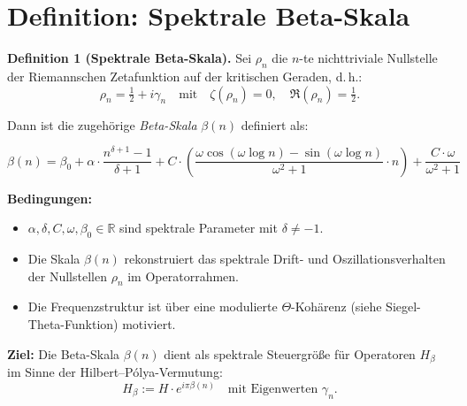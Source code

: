 \documentclass{article}
\begin{document}
\section*{Definition: Spektrale Beta-Skala}

\textbf{Definition 1 (Spektrale Beta-Skala).}  
Sei $\rho_n$ die $n$-te nichttriviale Nullstelle der Riemannschen Zetafunktion auf der kritischen Geraden, d.\,h.:
\[
\rho_n = \tfrac{1}{2} + i\gamma_n \quad \text{mit} \quad \zeta(\rho_n) = 0, \quad \Re(\rho_n) = \tfrac{1}{2}.
\]

Dann ist die zugehörige \emph{Beta-Skala} $\beta(n)$ definiert als:

\[
\boxed{
\beta(n) = \beta_0 + \alpha \cdot \frac{n^{\delta + 1} - 1}{\delta + 1} + C \cdot \left( \frac{\omega \cos(\omega \log n) - \sin(\omega \log n)}{\omega^2 + 1} \cdot n \right) + \frac{C \cdot \omega}{\omega^2 + 1}
}
\]

\textbf{Bedingungen:}
\begin{itemize}
  \item $\alpha, \delta, C, \omega, \beta_0 \in \mathbb{R}$ sind spektrale Parameter mit $\delta \ne -1$.
  \item Die Skala $\beta(n)$ rekonstruiert das spektrale Drift- und Oszillationsverhalten der Nullstellen $\rho_n$ im Operatorrahmen.
  \item Die Frequenzstruktur ist über eine modulierte $\Theta$-Kohärenz (siehe Siegel-Theta-Funktion) motiviert.
\end{itemize}

\textbf{Ziel:} Die Beta-Skala $\beta(n)$ dient als spektrale Steuergröße für Operatoren $H_\beta$ im Sinne der Hilbert–Pólya-Vermutung:
\[
H_\beta := H \cdot e^{i\pi\beta(n)} \quad \text{mit Eigenwerten } \gamma_n.
\]
\end{document}
